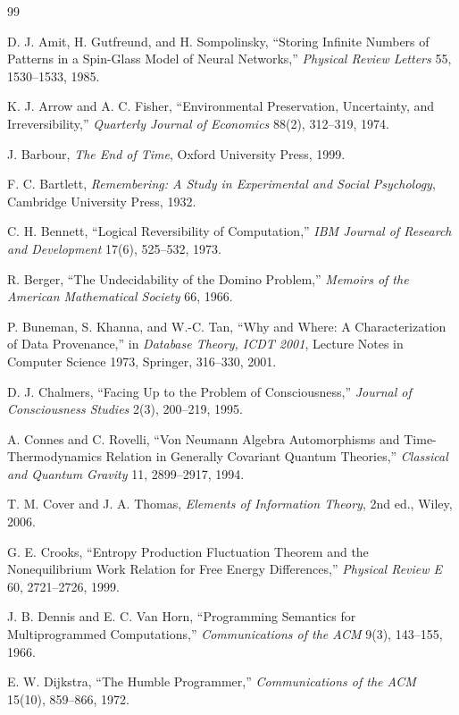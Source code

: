 \documentclass[11pt,twoside,openright]{book}
\theoremstyle{plain}
\theoremstyle{definition}
\theoremstyle{remark}
\begin{document}
\begin{thebibliography}{99}
\small

 D. J. Amit, H. Gutfreund, and H. Sompolinsky, ``Storing Infinite Numbers of Patterns in a Spin-Glass Model of Neural Networks,'' \emph{Physical Review Letters} 55, 1530--1533, 1985.

 K. J. Arrow and A. C. Fisher, ``Environmental Preservation, Uncertainty, and Irreversibility,'' \emph{Quarterly Journal of Economics} 88(2), 312--319, 1974.

 J. Barbour, \emph{The End of Time}, Oxford University Press, 1999.

 F. C. Bartlett, \emph{Remembering: A Study in Experimental and Social Psychology}, Cambridge University Press, 1932.

 C. H. Bennett, ``Logical Reversibility of Computation,'' \emph{IBM Journal of Research and Development} 17(6), 525--532, 1973.

 R. Berger, ``The Undecidability of the Domino Problem,'' \emph{Memoirs of the American Mathematical Society} 66, 1966.

 P. Buneman, S. Khanna, and W.-C. Tan, ``Why and Where: A Characterization of Data Provenance,'' in \emph{Database Theory, ICDT 2001}, Lecture Notes in Computer Science 1973, Springer, 316--330, 2001.

 D. J. Chalmers, ``Facing Up to the Problem of Consciousness,'' \emph{Journal of Consciousness Studies} 2(3), 200--219, 1995.

 A. Connes and C. Rovelli, ``Von Neumann Algebra Automorphisms and Time-Thermodynamics Relation in Generally Covariant Quantum Theories,'' \emph{Classical and Quantum Gravity} 11, 2899--2917, 1994.

 T. M. Cover and J. A. Thomas, \emph{Elements of Information Theory}, 2nd ed., Wiley, 2006.

 G. E. Crooks, ``Entropy Production Fluctuation Theorem and the Nonequilibrium Work Relation for Free Energy Differences,'' \emph{Physical Review E} 60, 2721--2726, 1999.

 J. B. Dennis and E. C. Van Horn, ``Programming Semantics for Multiprogrammed Computations,'' \emph{Communications of the ACM} 9(3), 143--155, 1966.

 E. W. Dijkstra, ``The Humble Programmer,'' \emph{Communications of the ACM} 15(10), 859--866, 1972.


\end{thebibliography}
\end{document}
